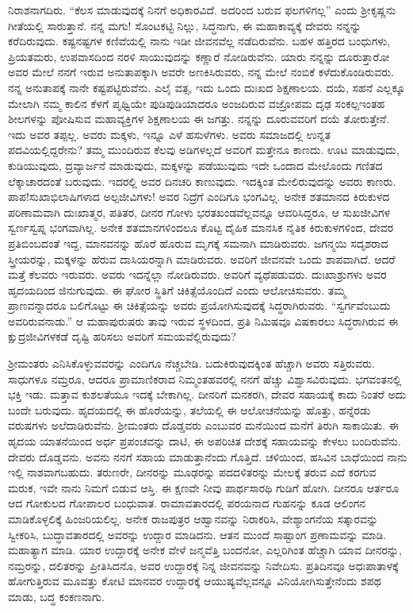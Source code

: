 ನಿರಾಶನಾಗದಿರು. “ಕೆಲಸ ಮಾಡುವುದಕ್ಕೆ ನಿನಗೆ ಅಧಿಕಾರವಿದೆ. ಅದರಿಂದ ಬರುವ ಫಲಗಳಿಗಲ್ಲ” ಎಂದು ಶ‍್ರೀಕೃಷ್ಣನು ಗೀತೆಯಲ್ಲಿ ಸಾರುತ್ತಾನೆ. ನನ್ನ ಮಗು! ಸೊಂಟಕಟ್ಟಿ ನಿಲ್ಲು, ಸಿದ್ಧನಾಗು, ಈ ಮಹಾಕಾವ್ಯಕ್ಕೆ ದೇವರು ನನ್ನನ್ನು ಕರೆದಿರುವುದು. ಕಷ್ಟನಷ್ಟಗಳ ಕಣಿವೆಯಲ್ಲಿ ನಾನು ಇಡೀ ಜೀವನವೆಲ್ಲ ನಡೆದಿರುವೆನು. ಬಹಳ ಹತ್ತಿರದ ಬಂಧುಗಳು, ಪ್ರಿಯತಮರು, ಉಪವಾಸದಿಂದ ನರಳಿ ಸಾಯುವುದನ್ನು ಕಣ್ಣಾರೆ ನೋಡಿರುವೆನು. ಯಾರು ನನ್ನನ್ನು ದೂರುತ್ತಾರೋ ಅವರ ಮೇಲೆ ನನಗೆ ಇರುವ ಅನುತಾಪಕ್ಕಾಗಿ ಅವರೇ ಅಣಕಿಸಿರುವರು, ನನ್ನ ಮೇಲೆ ನಂಬಿಕೆ ಕಳೆದುಕೊಂಡಿರುವರು. ನನ್ನ ಅನುತಾಪಕ್ಕೆ ನಾನೇ ಕಷ್ಟಪಟ್ಟಿರುವೆನು. ಎಲೈ ವತ್ಸ, ಇದು ಒಂದು ದುಃಖದ ಶಿಕ್ಷಣಾಲಯ. ದಯೆ, ಸಹನೆ ಎಲ್ಲಕ್ಕೂ ಮೇಲಾಗಿ ನಮ್ಮ ಕಾಲಿನ ಕೆಳಗೆ ಪೃಥ್ವಿಯೇ ಪುಡಿಪುಡಿಯಾದರೂ ಅಂಜದಿರುವ ವಜ್ರೋಪಮ ದೃಢ ಸಂಕಲ್ಪ\enginline{-}ಇಂತಹ ಶೀಲಗಳನ್ನು ಪೋಷಿಸುವ ಮಹಾವ್ಯಕ್ತಿಗಳ ಶಿಕ್ಷಣಾಲಯ ಈ ಜಗತ್ತು. ನನ್ನನ್ನು ದೂರುವವರಿಗೆ ದಯೆ ತೋರುತ್ತೇನೆ. ಇದು ಅವರ ತಪ್ಪಲ್ಲ. ಅವರು ಮಕ್ಕಳು, ಇನ್ನೂ ಎಳೆ ಹಸುಳೆಗಳು. ಅವರು ಸಮಾಜದಲ್ಲಿ ಉನ್ನತ ಪದವಿಯಲ್ಲಿದ್ದರೇನು? ತಮ್ಮ ಮುಂದಿರುವ ಕೆಲವು ಅಡಿಗಳಲ್ಲದೆ ಅವರಿಗೆ ಮತ್ತೇನೂ ಕಾಣದು. ಊಟ ಮಾಡುವುದು, ಕುಡಿಯುವುದು, ದ್ರವ್ಯಾರ್ಜನೆ ಮಾಡುವುದು, ಮಕ್ಕಳನ್ನು ಪಡೆಯುವುದು ಇದೇ ಒಂದಾದ ಮೇಲೊಂದು ಗಣಿತದ ಲೆಕ್ಕಾಚಾರದಂತೆ ಬರುವುದು. ಇದರಲ್ಲಿ ಅವರ ದಿನಚರಿ ಕಾಣುವುದು. ಇದಕ್ಕಿಂತ ಮೇಲಿರುವುದನ್ನು ಅವರು ಕಾಣರು. ಪಾಪ!ಸುಖಾಭಿಲಾಷಿಗಳಾದ ಅಲ್ಪಜೀವಿಗಳು! ಅವರ ನಿದ್ರೆಗೆ ಎಂದಿಗೂ ಭಂಗವಿಲ್ಲ. ಅನೇಕ ಶತಮಾನದ ಕಿರುಕುಳದ ಪರಿಣಾಮವಾಗಿ ದುಃಖಾತ್ಮರ, ಪತಿತರ, ದೀನರ ಗೋಳು ಭರತಖಂಡವೆಲ್ಲವನ್ನೂ ಆವರಿಸಿದ್ದರೂ, ಆ ಸುಖಜೀವಿಗಳ ಸ್ವರ್ಣಸ್ವಪ್ನ ಭಂಗವಾಗಿಲ್ಲ. ಅನೇಕ ಶತಮಾನಗಳಿಂದಲೂ ಕೊಟ್ಟ ದೈಹಿಕ ಮಾನಸಿಕ ನೈತಿಕ ಕಿರುಕುಳಗಳಿಂದ, ದೇವರ ಪ್ರತಿಬಿಂಬದಂತೆ ಇದ್ದ, ಮಾನವನನ್ನು ಹೊರೆ ಹೊರುವ ಮೃಗಕ್ಕೆ ಸಮನಾಗಿ ಮಾಡಿರುವರು. ಜಗನ್ಮಯಿ ಸದೃಶರಾದ ಸ್ತ್ರೀಯರನ್ನು, ಮಕ್ಕಳನ್ನು ಹೆರುವ ದಾಸಿಯರನ್ನಾಗಿ ಮಾಡಿರುವರು. ಅವರಿಗೆ ಜೀವನವೇ ಒಂದು ಶಾಪವಾಗಿದೆ. ಆದರೆ ಮತ್ತೆ ಕೆಲವರು ಇರುವರು. ಅವರು ಇದನ್ನೆಲ್ಲಾ ನೋಡಿರುವರು. ಅವರಿಗೆ ವ್ಯಥೆಪಡುವರು. ದುಃಖಾಶ್ರುಗಳು ಅವರ ಹೃದಯದಿಂದ ಜಿನುಗುವುದು. ಈ ಘೋರ ಸ್ಥಿತಿಗೆ ಚಿಕಿತ್ಸೆಯೊಂದಿದೆ ಎಂದು ಆಲೋಚಿಸುವರು. ತಮ್ಮ ಪ್ರಾಣವನ್ನಾದರೂ ಬಲಿಗೊಟ್ಟು ಈ ಚಿಕಿತ್ಸೆಯನ್ನು ಅವರು ಪ್ರಯೋಗಿಸುವುದಕ್ಕೆ ಸಿದ್ಧರಾಗಿರುವರು. “ಸ್ವರ್ಗವೆಂಬುದು ಅವರಿರುವನಾಡು.” ಆ ಮಹಾಪುರುಷರು ತಾವು ಇರುವ ಸ್ಥಳದಿಂದ, ಪ್ರತಿ ನಿಮಿಷವೂ ವಿಷಕಾರಲು ಸಿದ್ಧರಾಗಿರುವ ಈ ಕ್ಷುದ್ರಜೀವಿಗಳಕಡೆ ದೃಷ್ಟಿ ಹರಿಸಲು ಅವರಿಗೆ ಸಮಯವೆಲ್ಲಿರುವುದು?
 
ಶ‍್ರೀಮಂತರು ಎನಿಸಿಕೊಳ್ಳುವವರನ್ನು ಎಂದಿಗೂ ನೆಚ್ಚಬೇಡಿ. ಬದುಕಿರುವುದಕ್ಕಿಂತ ಹೆಚ್ಚಾಗಿ ಅವರು ಸತ್ತಿರುವರು. ಸಾಧುಗಳೂ ನಮ್ರರೂ, ಆದರೂ ಪ್ರಾಮಾಣಿಕರಾದ ನಿಮ್ಮಂತಹವರಲ್ಲಿ ನನಗೆ ಹೆಚ್ಚು ವಿಶ್ವಾಸವಿರುವುದು. ಭಗವಂತನಲ್ಲಿ ಭಕ್ತಿ ಇಡು. ಮತ್ತಾವ ಕುಶಲತೆಯೂ ಇದಕ್ಕೆ ಬೇಕಾಗಿಲ್ಲ. ದೀನರಿಗೆ ಮನಕರಗಿ, ದೇವರ ಸಹಾಯಕ್ಕೆ ಕಾದು ನಿಂತರೆ ಅದು ಬಂದೇ ಬರುವುದು. ಹೃದಯದಲ್ಲಿ ಈ ಹೊರೆಯನ್ನು, ತಲೆಯಲ್ಲಿ ಈ ಆಲೋಚನೆಯನ್ನು ಹೊತ್ತು, ಹನ್ನೆರಡು ವರುಷಗಳು ಅಲೆದಾಡಿರುವೆನು. ಶ‍್ರೀಮಂತರು ದೊಡ್ಡವರು ಎಂಬುವರ ಮನೆಯಿಂದ ಮನೆಗೆ ತಿರುಗಿ ಸಾಕಾಯಿತು. ಈ ಹೃದಯ ಯಾತನೆಯಿಂದ ಅರ್ಧ ಪ್ರಪಂಚವನ್ನು ದಾಟಿ, ಈ ಅಪರಿಚಿತ ದೇಶಕ್ಕೆ ಸಹಾಯವನ್ನು ಕೇಳಲು ಬಂದಿರುವೆನು. ದೇವರು ದೊಡ್ಡವನು. ಅವನು ನನಗೆ ಸಹಾಯ ಮಾಡುತ್ತಾನೆಂದು ಗೊತ್ತಿದೆ. ಚಳಿಯಿಂದ, ಹಸಿವಿನ ಬಾಧೆಯಿಂದ ನಾನು ಇಲ್ಲಿ ನಾಶವಾಗಬಹುದು. ತರುಣರೇ, ದೀನರನ್ನು ಮೂಢರನ್ನು ಪದದಳಿತರನ್ನು ಮೇಲಕ್ಕೆ ತರುವ ಎದೆ ಕರಗುವ ಮರುಕ, ಇವೇ ನಾನು ನಿಮಗೆ ಬಿಡುವ ಆಸ್ತಿ. ಈ ಕ್ಷಣವೇ ನೀವು ಪಾರ್ಥಸಾರಥಿ ಗುಡಿಗೆ ಹೋಗಿ. ದೀನರೂ ಆರ್ತರೂ ಆದ ಗೋಕುಲದ ಗೋಪಾಲರ ಬಂಧುವಾತ. ರಾಮಾವತಾರದಲ್ಲಿ ಪರಯನಾದ ಗುಹನನ್ನು ಕೂಡ ಆಲಿಂಗನ ಮಾಡಿಕೊಳ್ಳಲಿಕ್ಕೆ ಹಿಂಜರಿಯಲಿಲ್ಲ. ಅನೇಕ ರಾಜಪುತ್ರರ ಆಹ್ವಾನವನ್ನು ನಿರಾಕರಿಸಿ, ವೇಶ್ಯಾಂಗನೆಯ ಸತ್ಕಾರವನ್ನು ಸ್ವೀಕರಿಸಿ, ಬುದ್ಧಾವತಾರದಲ್ಲಿ ಅವರನ್ನು ಉದ್ದಾರ ಮಾಡಿದನು. ಆತನ ಮುಂದೆ ಸಾಷ್ಟಾಂಗ ಪ್ರಣಾಮವನ್ನು ಮಾಡಿ. ಮಹಾತ್ಯಾಗ ಮಾಡಿ. ಯಾರ ಉದ್ದಾರಕ್ಕೆ ಅನೇಕ ವೇಳೆ ಜನ್ಮವೆತ್ತಿ ಬಂದನೋ, ಎಲ್ಲರಿಗಿಂತ ಹೆಚ್ಚಾಗಿ ಯಾವ ದೀನರನ್ನು, ನಮ್ರರನ್ನು, ದಲಿತರನ್ನು ಪ್ರೀತಿಸಿದನೊ, ಅವರ ಉದ್ದಾರಕ್ಕೆ ನಿನ್ನ ಜೀವನವನ್ನು ನಿವೇದಿಸು. ಪ್ರತಿದಿನವೂ ಅಧಃಪಾತಾಳಕ್ಕೆ ಹೋಗುತ್ತಿರುವ ಮೂವತ್ತು ಕೋಟಿ ಮಾನವರ ಉದ್ದಾರಕ್ಕೆ ಆಯುಷ್ಯವೆಲ್ಲವನ್ನೂ ವಿನಿಯೋಗಿಸುತ್ತೇನೆಂದು ಶಪಥ ಮಾಡು, ಬದ್ಧ ಕಂಕಣನಾಗು.

